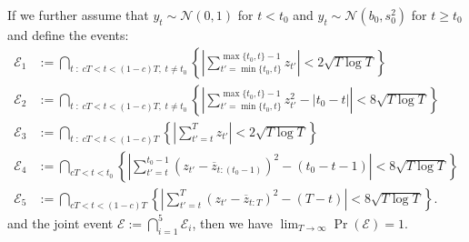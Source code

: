 \begin{lemma}
If we further assume that $y_t \sim \mathcal{N}(0,1)$ for $t < t_0$ and $y_t \sim \mathcal{N}(b_0,s^2_0)$ for $t \geq t_0$ and define the events: 
\begin{align*}
    \mathcal{E}_1 &:= \bigcap_{t \;:\; cT < t < (1-c)T,\; t \neq t_0} \left\{\left|\sum_{t'=\min\{t_0,t\}}^{\max\{t_0,t\}-1} z_{t'}\right| < 2\sqrt{T \log T} \right\} \\
    \mathcal{E}_2 &:=  \bigcap_{t \;:\; cT < t < (1-c)T,\; t \neq t_0}  \left\{\left|\sum_{t'=\min\{t_0,t\}}^{\max\{t_0,t\}-1} z_{t'}^2 - |t_0-t| \right| < 8\sqrt{T \log T} \right\}  \\
    \mathcal{E}_3 &:= \bigcap_{t \;:\; cT < t < (1-c)T} \left\{\left|\sum_{t'=t}^T z_{t'}\right| < 2\sqrt{T \log T} \right\} \\
    \mathcal{E}_4 &:= \bigcap_{cT < t < t_0} \left\{\left|\sum_{t'=t}^{t_0-1} (z_{t'} - \overline{z}_{t:(t_0-1)})^2- (t_0 -t - 1)\right| < 8\sqrt{T \log T}\right\} \\
    \mathcal{E}_5 &:= \bigcap_{cT < t < (1-c) T} \left\{\left|\sum_{t'=t}^T (z_{t'} - \overline{z}_{t:T})^2 - (T-t)\right| < 8\sqrt{T \log T}\right\}.
\end{align*}
and the joint event $\mathcal{E} := \bigcap_{i=1}^5 \mathcal{E}_i$, then we have $\lim_{T\to\infty} \Pr(\mathcal{E}) = 1$. 
\end{lemma}

